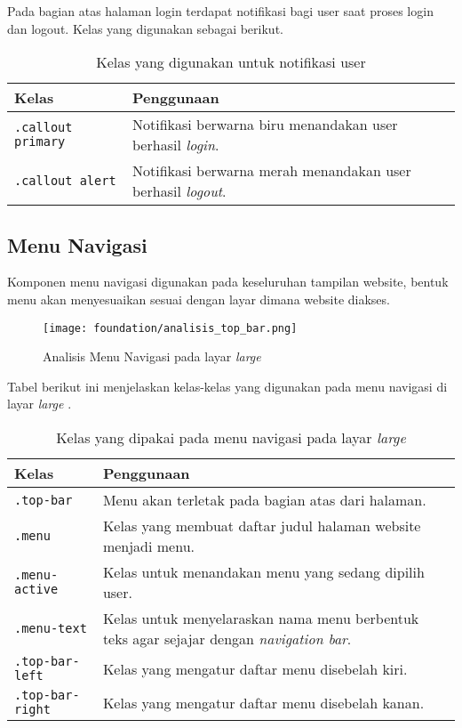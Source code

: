 Pada bagian atas halaman login terdapat notifikasi bagi user saat proses login dan logout. Kelas yang digunakan sebagai berikut.\\

\begin{table}[H]
	\centering
	\begin{tabularx}{\textwidth}{lX}
		\toprule
		Kelas     & Penggunaan \\
		\midrule
		\texttt{.callout primary} & Notifikasi berwarna biru menandakan user berhasil \textit{login}.\\
		\texttt{.callout alert} & Notifikasi berwarna merah menandakan user berhasil \textit{logout}.\\
		\bottomrule
	\end{tabularx}%
	\caption{Kelas yang digunakan untuk notifikasi user}
\end{table}%


\subsection{Menu Navigasi}
Komponen menu navigasi digunakan pada keseluruhan tampilan website, bentuk menu akan menyesuaikan sesuai dengan layar dimana website diakses. \\

\begin{figure} [H]
	\centering  
	\texttt{[image: foundation/analisis\_top\_bar.png]}  
	\caption{Analisis Menu Navigasi pada layar \textit{large}} 
\end{figure}
Tabel berikut ini menjelaskan kelas-kelas yang digunakan pada menu navigasi di layar \textit{large} .\\

\begin{table}[H]
	\centering
	\begin{tabularx}{\textwidth}{lX}
		\toprule
		Kelas     & Penggunaan \\
		\midrule
		\texttt{.top-bar}	 & Menu akan terletak pada bagian atas dari halaman.\\	
		\texttt{.menu}	 & Kelas yang membuat daftar judul halaman website menjadi menu.\\
		\texttt{.menu-active} & Kelas untuk menandakan menu yang sedang dipilih user.\\
		\texttt{.menu-text} & Kelas untuk menyelaraskan nama menu berbentuk teks agar sejajar dengan \textit{navigation bar}.\\	
		\texttt{.top-bar-left} & Kelas yang mengatur daftar menu disebelah kiri.\\
		\texttt{.top-bar-right} & Kelas yang mengatur daftar menu disebelah kanan.\\
		\bottomrule
	\end{tabularx}%
	\caption{Kelas yang dipakai pada menu navigasi pada layar \textit{large}}
\end{table}%

